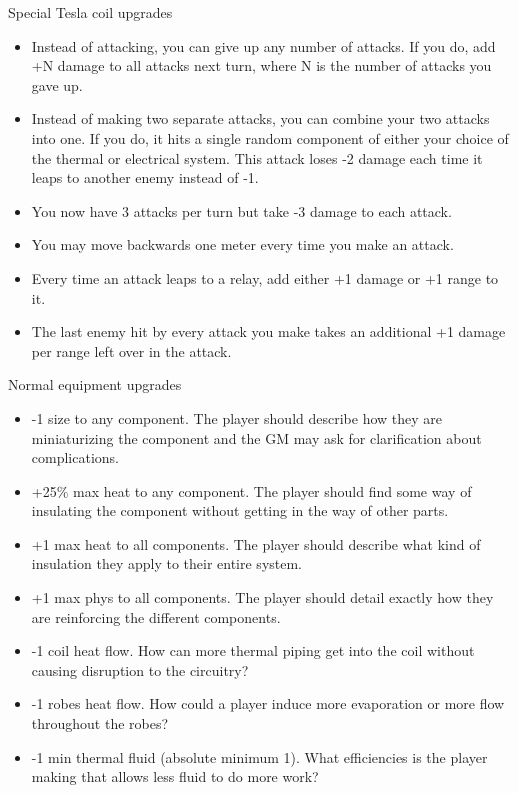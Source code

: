 \documentclass[a4paper]{article}
\begin{document}
Special Tesla coil upgrades

\begin{itemize}
\item Instead of attacking, you can give up any number of attacks. If you do, add +N damage to all attacks next turn, where N is the number of attacks you gave up.
\item Instead of making two separate attacks, you can combine your two attacks into one. If you do, it hits a single random component of either your choice of the thermal or electrical system. This attack loses -2 damage each time it leaps to another enemy instead of -1.
\item You now have 3 attacks per turn but take -3 damage to each attack.
\item You may move backwards one meter every time you make an attack.
\item Every time an attack leaps to a relay, add either +1 damage or +1 range to it.
\item The last enemy hit by every attack you make takes an additional +1 damage per range left over in the attack.
\end{itemize}

Normal equipment upgrades

\begin{itemize}
\item -1 size to any component. The player should describe how they are miniaturizing the component and the GM may ask for clarification about complications.
\item +25\% max heat to any component. The player should find some way of insulating the component without getting in the way of other parts.
\item +1 max heat to all components. The player should describe what kind of insulation they apply to their entire system.
\item +1 max phys to all components. The player should detail exactly how they are reinforcing the different components.
\item -1 coil heat flow. How can more thermal piping get into the coil without causing disruption to the circuitry?
\item -1 robes heat flow. How could a player induce more evaporation or more flow throughout the robes?
\item -1 min thermal fluid (absolute minimum 1). What efficiencies is the player making that allows less fluid to do more work? 
\end{itemize}
\end{document}
